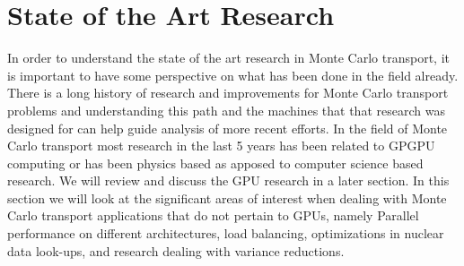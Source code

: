 \section{ \textbf{ State of the Art Research} }

In order to understand the state of the art research in Monte Carlo transport, it is important to have some perspective on what has been done in the field already.
%
There is a long history of research and improvements for Monte Carlo transport problems and understanding this path and the machines that that research was designed for can help guide analysis of more recent efforts.
%
In the field of Monte Carlo transport most research in the last 5 years has been related to GPGPU computing or has been physics based as apposed to computer science based research.
%
We will review and discuss the GPU research in a later section.
%
In this section we will look at the significant areas of interest when dealing with Monte Carlo transport applications that do not pertain to GPUs, namely Parallel performance on different architectures, load balancing, optimizations in nuclear data look-ups, and research dealing with variance reductions.
%
